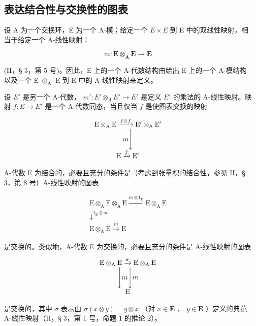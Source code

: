 \subsection{表达结合性与交换性的图表}

设 A 为一个交换环，E 为一个 A-模；给定一个 \(E \times E\) 到 E 中的双线性映射，相当于给定一个 A-线性映射：

\[
m: \mathbf {E} \otimes_ {\mathbf {A}} \mathbf {E} \rightarrow \mathbf {E}
\]

(II，§ 3，第 5 号)。因此，E 上的一个 A-代数结构由给出 E 上的一个 A-模结构以及一个 E \(\otimes_{\mathbf{A}}\) E 到 E 中的 A-线性映射来定义。

设 \(E'\) 是另一个 A-代数， \(m': E' \otimes_{A} E' \to E'\) 是定义 \(E'\) 的乘法的 A-线性映射。映射 \(f: E \to E'\) 是一个 A-代数同态，当且仅当 \(f\) 是使图表交换的映射

\[
\begin{array}{c} \mathrm{E} \otimes_ {\mathrm{A}} \mathrm{E} \xrightarrow {f \otimes f} \mathrm{E} ^ {\prime} \otimes_ {\mathrm{A}} \mathrm{E} ^ {\prime} \\ m \Biggl \downarrow \\ \mathrm{E} \xrightarrow {f} \mathrm{E} ^ {\prime} \end{array}
\]

A-代数 E 为结合的，必要且充分的条件是（考虑到张量积的结合性，参见 II，§ 3，第 8 号）A-线性映射的图表

\[
\begin{array}{c} \mathrm{E} \otimes_ {\mathrm{A}} \mathrm{E} \otimes_ {\mathrm{A}} \mathrm{E} \xrightarrow {m \otimes 1 _ {\mathrm{E}}} \mathrm{E} \otimes_ {\mathrm{A}} \mathrm{E} \\ \downarrow^ {1 _ {\mathrm{E}} \otimes m} \\ \mathrm{E} \otimes_ {\mathrm{A}} \mathrm{E} \xrightarrow {m} \mathrm{E} \end{array}
\]

是交换的。类似地，A-代数 E 为交换的，必要且充分的条件是 A-线性映射的图表

\[
\begin{array}{c} \mathrm{E} \otimes_ {\mathrm{A}} \mathrm{E} \xrightarrow {\sigma} \mathrm{E} \otimes_ {\mathrm{A}} \mathrm{E} \\ \Biggl \downarrow m \Biggl \downarrow m \\ \mathrm{E} \end{array}
\]

是交换的，其中 \(\sigma\) 表示由 \(\sigma(x \otimes y) = y \otimes x\) （对 \(x \in \mathbf{E}\) ， \(y \in \mathbf{E}\) ）定义的典范 A-线性映射（II，§ 3，第 1 号，命题 1 的推论 2）。

